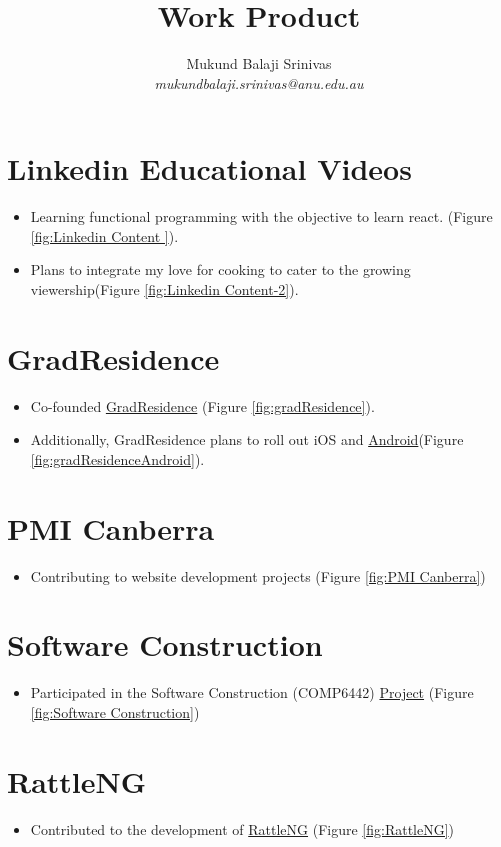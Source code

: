 \documentclass{article}
\title{Work Product}
\author{Mukund Balaji Srinivas\\\textit{mukundbalaji.srinivas@anu.edu.au}}
\begin{document}
\maketitle

\section*{Linkedin Educational Videos}
\begin{itemize}
    \item Learning functional programming with the objective to  learn react. (Figure \ref{fig:Linkedin Content }).
    \item Plans to integrate my love for cooking to cater to the growing viewership(Figure \ref{fig:Linkedin Content-2}).
\end{itemize}


\section*{GradResidence}
\begin{itemize}
    \item Co-founded \href{https://gradresidence.com/}{GradResidence} (Figure \ref{fig:gradResidence}).
    \item Additionally, GradResidence plans to roll out iOS and \href{https://github.com/gradresidence/android}{Android}(Figure \ref{fig:gradResidenceAndroid}).
\end{itemize}

\section*{PMI Canberra}
\begin{itemize}
    \item Contributing to website development projects (Figure \ref{fig:PMI Canberra})
\end{itemize}

\section*{Software Construction}
\begin{itemize}
    \item Participated in the Software Construction (COMP6442) \href{https://gitlab.cecs.anu.edu.au/u7544253/ga-23s1-comp2100-6442} {Project} (Figure \ref{fig:Software Construction})
\end{itemize}

\section*{RattleNG}
\begin{itemize}
    \item Contributed to the development of \href{https://github.com/gjwgit/rattleng}{RattleNG} (Figure \ref{fig:RattleNG})
\end{itemize}
\end{document}
